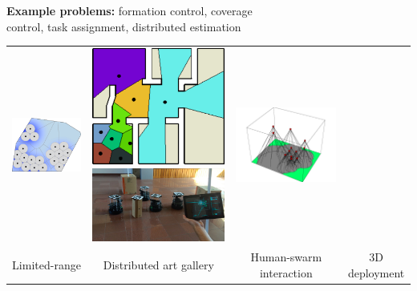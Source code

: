 \documentclass[10pt]{beamer}
\newcommand{\myemph}[1]{{\usebeamercolor[fg]{emphprimary}
    \textbf{#1}}}
\begin{document}
\begin{frame}
\vspace*{0.3cm} 

\myemph{Example problems:} formation control, coverage 
\\\hspace*{0.5cm}control, task assignment, distributed
estimation

\bigskip

    \begin{center}
        \setlength{\tabcolsep}{2pt}
  \begin{tabular}{cccc}
    \href{run:animations/run-RangeBased-area-addition-animation.mov}%
    {\includegraphics[width=.2\linewidth]{run-RangeBased-area-final}}
    &
    \href{run:animations/artgallery-partition+centering+heuristic-19feb04.mov}
    {\includegraphics[width=.18\linewidth]{artgallery-partition+centering+heuristic-19feb04-midway}}
    \href{run:lab/gaussian_normal_moving.mov}{\includegraphics[width=.22\linewidth]{deployment-lobby-EBUI}}
    &
    \href{run:movies/toward-circumcenter-3D-animation.mov}%
    {\includegraphics[width=.22\linewidth]{3d-coverage}}%
    \\[-1ex]
    \tiny{Limited-range} &
    \tiny{Distributed art gallery} &
    \tiny{Human-swarm interaction} &    
    \tiny{3D deployment}
  \end{tabular}
    \end{center}

\vspace*{-2cm}


\end{frame}
\end{document}
